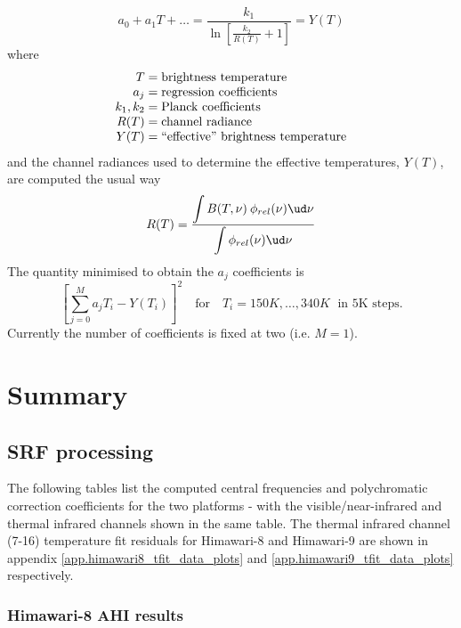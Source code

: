 \begin{equation}
  a_0 + a_1T + \ldots = \frac{\displaystyle k_1}{\displaystyle \ln\left[\frac{k_2}{R(T)}+1\right]} = Y(T)
\end{equation}
where
\begin{equation}
  \begin{array}{r@{\;=\;}l}
         T &\mbox{brightness temperature} \\
        a_j&\mbox{regression coefficients} \\
    k_1,k_2&\mbox{Planck coefficients} \\
       R(T)&\mbox{channel radiance} \\
       Y(T)&\mbox{``effective'' brightness temperature}
  \end{array}
\end{equation}
and the channel radiances used to determine the effective temperatures, $Y(T)$, are computed the usual way
\begin{equation}
  R(T) = \frac{\displaystyle\int{B(T,\nu)\:\phi_{rel}(\nu)\ud \nu}}{\displaystyle\int{\phi_{rel}(\nu)\ud \nu}}
\end{equation}
The quantity minimised to obtain the $a_j$ coefficients is
\begin{equation}
  \left[ \sum_{j=0}^{M}a_j T_{i} - Y(T_{i}) \right]^2 \quad\mbox{for}\quad T_i = 150K, \ldots, 340K \;\mbox{ in 5K steps.}
\end{equation}
Currently the number of coefficients is fixed at two (i.e. $M=1$).


\newpage
\section{Summary}
\subsection{SRF processing}
The following tables list the computed central frequencies and polychromatic correction coefficients for the two platforms - with the visible/near-infrared and thermal infrared channels shown in the same table. The thermal infrared channel (7-16) temperature fit residuals for Himawari-8 and Himawari-9 are shown in appendix \ref{app.himawari8_tfit_data_plots} and \ref{app.himawari9_tfit_data_plots} respectively.

\subsubsection{Himawari-8 AHI results}

